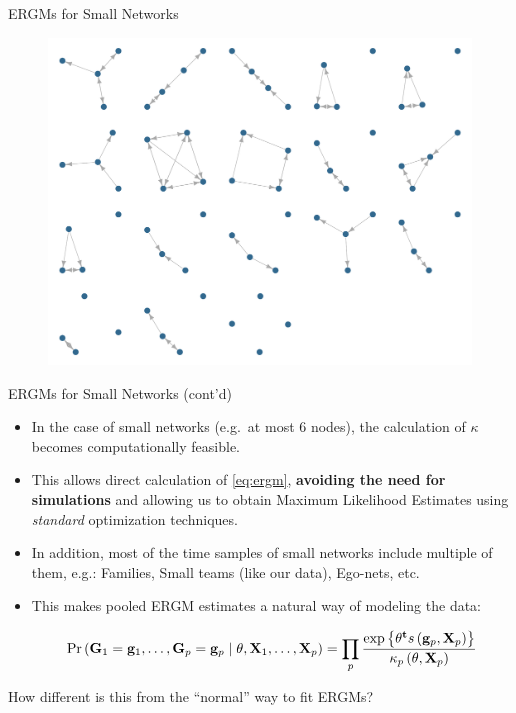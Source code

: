 \documentclass[10pt,ignorenonframetext,aspectratio=169,]{beamer}
\newcommand{\Prcond}[2]{{\mbox{Pr}\left(#1\vphantom{#2}\;\right|\left.\vphantom{#1}#2\right)}}
\newcommand{\sufstats}[1]{s\left(#1\right)}
\renewcommand{\exp}[1]{\mbox{exp}\left\{#1\right\}}
\newcommand{\transpose}[1]{{#1}^\mathbf{t}}
\newcommand{\params}{\theta}
\newcommand{\Graph}{\mathbf{G}}
\newcommand{\graph}{\mathbf{g}}
\newcommand{\Indepvar}{\mathbf{X}}
\begin{document}
\begin{frame}{ERGMs for Small Networks}
\protect\hypertarget{ergms-for-small-networks}{}

\begin{figure}
\centering
\includegraphics[height=.9\textheight]{plot-graph-4-1.pdf}
\end{figure}

\end{frame}

\begin{frame}{ERGMs for Small Networks (cont'd)}
\protect\hypertarget{ergms-for-small-networks-contd}{}

\begin{itemize}
\item
  In the case of small networks (e.g.~at most 6 nodes), the calculation
  of \(\kappa\) becomes computationally feasible.\pause
\item
  This allows direct calculation of \eqref{eq:ergm},
  \textbf{avoiding the need for simulations} and allowing us to obtain
  Maximum Likelihood Estimates using \textit{standard} optimization
  techniques.\pause
\item
  In addition, most of the time samples of small networks include
  multiple of them, e.g.: Families, Small teams (like our data),
  Ego-nets, etc.\pause
\item
  This makes pooled ERGM estimates a natural way of modeling the data:
  \pause{}

  \[
  \Prcond{\Graph_1 = \graph_1, \dots, \Graph_p = \graph_p}{\params, \Indepvar_1, \dots, \Indepvar_p} = \prod_p\frac{%
          \exp{\transpose{\params}\sufstats{\graph_p, \Indepvar_p}}%
      }{
          \kappa_p\left(\params, \Indepvar_p\right)
      }
  \]
\end{itemize}

\pause

How different is this from the ``normal'' way to fit ERGMs?

\end{frame}
\end{document}
